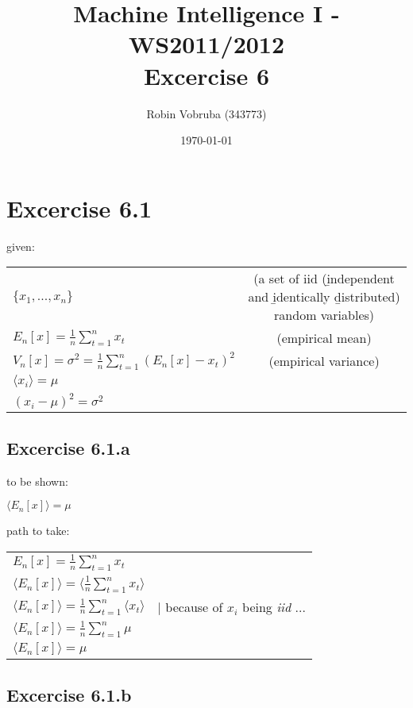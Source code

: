 \documentclass[a4paper,headings=small]{scrartcl}
\title{Machine Intelligence I - WS2011/2012\\Excercise 6}
\author{Robin Vobruba (343773)}
\date{\today}
\numberwithin{equation}{section} %
\numberwithin{figure}{section}   %
\begin{document}
\maketitle


\section{Excercise 6.1}

given:

\begin{tabular}{lc}
$\{x_1, ... , x_n\}$ & (a set of iid (\b{i}ndependent and \b{i}dentically \b{d}istributed) random variables) \\

$E_n[x] = \frac{1}{n} \sum\limits_{t=1}^{n}{x_t}$ & (empirical mean) \\

$V_n[x] = \sigma^2 = \frac{1}{n} \sum\limits_{t=1}^{n}{(E_n[x] - x_t)^2}$ & (empirical variance) \\

$\langle x_i \rangle = \mu$ \\

$(x_i − \mu)^2 = \sigma^2$
\end{tabular}


\subsection{Excercise 6.1.a}

to be shown:

$\langle E_n[x] \rangle = \mu$

path to take:

\begin{tabular}{lc}
$E_n[x] = \frac{1}{n} \sum\limits_{t=1}^{n}{x_t}$ \\

$\langle E_n[x] \rangle = \langle \frac{1}{n} \sum\limits_{t=1}^{n}{x_t} \rangle$ \\

$\langle E_n[x] \rangle = \frac{1}{n} \sum\limits_{t=1}^{n}{\langle x_t \rangle}$ & $|$ because of $x_i$ being \emph{iid} ... \\

$\langle E_n[x] \rangle = \frac{1}{n} \sum\limits_{t=1}^{n}{\mu}$ \\

$\langle E_n[x] \rangle = \mu$
\end{tabular}


\subsection{Excercise 6.1.b}
\end{document}
